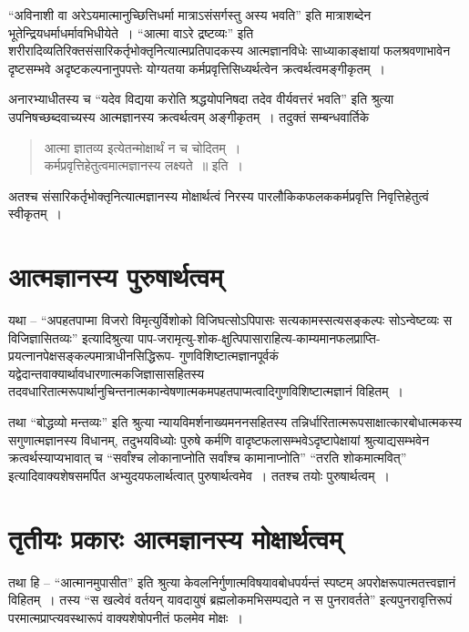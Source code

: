 {“अविनाशी वा अरेऽयमात्मानुच्छित्तिधर्मा मात्राऽसंसर्गस्तु अस्य भवति” इति मात्रा\-शब्देन भूतेन्द्रियधर्माधर्मावभिधीयेते~। “आत्मा वाऽरे द्रष्टव्यः” इति शरीरादिव्यतिरिक्त\-संसारिकर्तृभोक्तृनित्यात्मप्रतिपादकस्य आत्मज्ञानविधेः साध्याकाङ्क्षायां फलश्रवणाभावेन दृष्टसम्भवे अदृष्टकल्पनानुपपत्तेः योग्यतया कर्मप्रवृत्तिसिध्यर्थत्वेन क्रत्वर्थत्वमङ्गीकृतम्~। 

अनारभ्याधीतस्य च “यदेव विद्यया करोति श्रद्धयोपनिषदा तदेव वीर्यवत्तरं भवति” इति श्रुत्या उपनिषच्छब्दवाच्यस्य आत्मज्ञानस्य क्रत्वर्थत्वम् अङ्गीकृतम्~। तदुक्तं सम्बन्धवार्तिके 
\begin{verse}
आत्मा ज्ञातव्य इत्येतन्मोक्षार्थं न च चोदितम्~। \\
कर्मप्रवृत्तिहेतुत्वमात्मज्ञानस्य लक्ष्यते~॥ इति~। 
\end{verse}
अतश्च संसारिकर्तृभोक्तृनित्यात्मज्ञानस्य मोक्षार्थत्वं निरस्य पारलौकिकफलककर्मप्रवृत्ति निवृत्तिहेतुत्वं स्वीकृतम्~। 

\section*{आत्मज्ञानस्य पुरुषार्थत्वम्}

 यथा – “अपहतपाप्मा विजरो विमृत्युर्विशोको विजिघत्सोऽपिपासः सत्यकामस्सत्यसङ्कल्पः सोऽन्वेष्टव्यः स विजिज्ञासितव्यः” इत्यादि\-श्रुत्या पाप-जरामृत्यु-शोक-क्षुत्पिपासाराहित्य-काम्यमानफलप्राप्ति-प्रयत्नानपेक्षसङ्कल्पमात्राधीन\-सिद्धिरूप- गुणविशिष्टात्मज्ञानपूर्वकं यद्वेदान्तवाक्यार्थावधारणात्मकजिज्ञासासहितस्य तदवधारितात्मरूपार्थानुचिन्तनात्मकान्वेषणात्मकमपहतपाप्मत्वादिगुणविशिष्टात्मज्ञानं विहितम्~। 

तथा “बोद्धव्यो मन्तव्यः” इति श्रुत्या न्यायविमर्शनाख्यमननसहितस्य तन्निर्धारितात्मरूपसाक्षात्कारबोधात्मकस्य सगुणात्मज्ञानस्य विधानम्, तदुभयविध्योः पुरुषे कर्मणि वा\break दृष्टफलासम्भवेऽदृष्टापेक्षायां श्रुत्याद्यसम्भवेन क्रत्वर्थस्याप्यभावात् च “सर्वांश्च लोकानाप्नोति सर्वांश्च कामानाप्नोति” “तरति शोकमात्मवित्” इत्यादिवाक्यशेषसमर्पित अभ्युदय\-फलार्थत्वात् पुरुषार्थत्वमेव~। ततश्च तयोः पुरुषार्थत्वम्~। 

\section*{तृतीयः प्रकारः\enginline{-} आत्मज्ञानस्य मोक्षार्थत्वम् }

तथा हि – “आत्मानमुपासीत” इति श्रुत्या केवलनिर्गुणात्मविषयावबोधपर्यन्तं स्पष्टम् अपरोक्षरूपात्मतत्त्वज्ञानं विहितम्~। तस्य “स खल्वेवं वर्तयन् यावदायुषं ब्रह्मलोकमभिसम्पद्यते न स पुनरावर्तते” इत्यपुनरावृत्तिरूपं परमात्मप्राप्त्यवस्थारूपं वाक्यशेषोपनीतं फलमेव मोक्षः~। 

}
